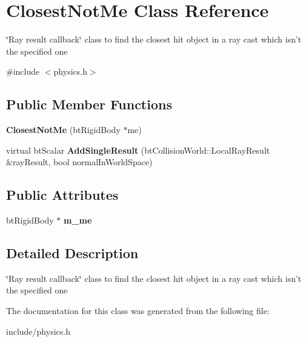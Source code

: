 \hypertarget{classClosestNotMe}{
\section{\-Closest\-Not\-Me \-Class \-Reference}
\label{d2/d02/classClosestNotMe}
}


\char`\"{}\-Ray result callback\char`\"{} class to find the closest hit object in a ray cast which isn't the specified one  




{\ttfamily \#include $<$physics.\-h$>$}

\subsection*{\-Public \-Member \-Functions}
\begin{DoxyCompactItemize}
\item 
\hypertarget{classClosestNotMe_a3b8801baa679f4a56748f880a2c417fa}{
{\bfseries \-Closest\-Not\-Me} (bt\-Rigid\-Body $\ast$me)}
\label{d2/d02/classClosestNotMe_a3b8801baa679f4a56748f880a2c417fa}

\item 
\hypertarget{classClosestNotMe_a6baac61bad8e34032a181d9ce44b3827}{
virtual bt\-Scalar {\bfseries \-Add\-Single\-Result} (bt\-Collision\-World\-::\-Local\-Ray\-Result \&ray\-Result, bool normal\-In\-World\-Space)}
\label{d2/d02/classClosestNotMe_a6baac61bad8e34032a181d9ce44b3827}

\end{DoxyCompactItemize}
\subsection*{\-Public \-Attributes}
\begin{DoxyCompactItemize}
\item 
\hypertarget{classClosestNotMe_a9d1a92a7e75baab17a3d4c3b595d8aa7}{
bt\-Rigid\-Body $\ast$ {\bfseries m\-\_\-me}}
\label{d2/d02/classClosestNotMe_a9d1a92a7e75baab17a3d4c3b595d8aa7}

\end{DoxyCompactItemize}


\subsection{\-Detailed \-Description}
\char`\"{}\-Ray result callback\char`\"{} class to find the closest hit object in a ray cast which isn't the specified one 

\-The documentation for this class was generated from the following file\-:\begin{DoxyCompactItemize}
\item 
include/physics.\-h\end{DoxyCompactItemize}
